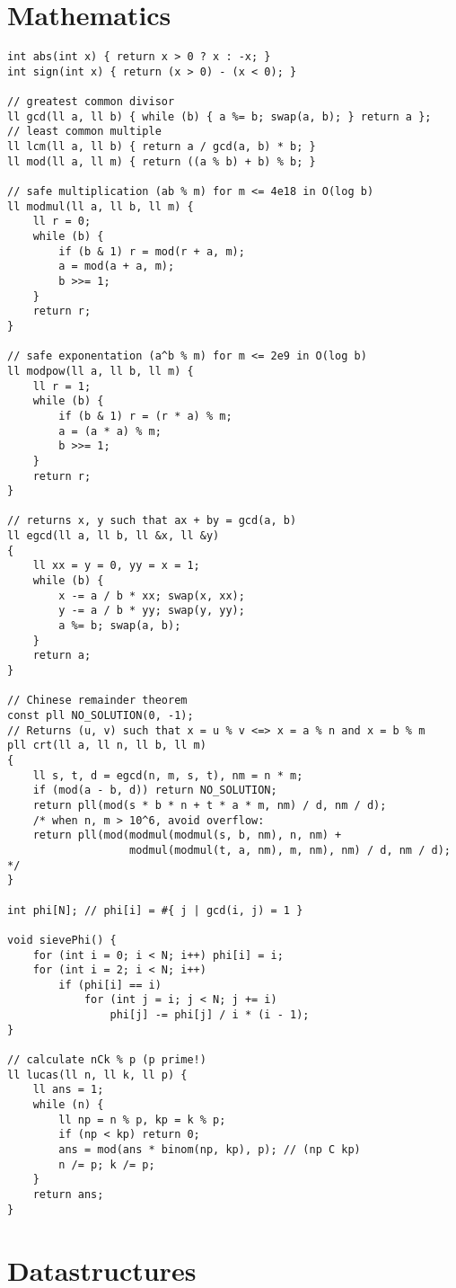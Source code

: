 \documentclass{article}
\begin{document}
\section{Mathematics}

\begin{lstlisting}
int abs(int x) { return x > 0 ? x : -x; }
int sign(int x) { return (x > 0) - (x < 0); }

// greatest common divisor
ll gcd(ll a, ll b) { while (b) { a %= b; swap(a, b); } return a };
// least common multiple
ll lcm(ll a, ll b) { return a / gcd(a, b) * b; }
ll mod(ll a, ll m) { return ((a % b) + b) % b; }

// safe multiplication (ab % m) for m <= 4e18 in O(log b)
ll modmul(ll a, ll b, ll m) {
	ll r = 0;
	while (b) {
		if (b & 1) r = mod(r + a, m);
		a = mod(a + a, m);
		b >>= 1;
	}
	return r;
}

// safe exponentation (a^b % m) for m <= 2e9 in O(log b)
ll modpow(ll a, ll b, ll m) {
	ll r = 1;
	while (b) {
		if (b & 1) r = (r * a) % m;
		a = (a * a) % m;
		b >>= 1;
	}
	return r;
}

// returns x, y such that ax + by = gcd(a, b)
ll egcd(ll a, ll b, ll &x, ll &y)
{
	ll xx = y = 0, yy = x = 1;
	while (b) {
		x -= a / b * xx; swap(x, xx);
		y -= a / b * yy; swap(y, yy);
		a %= b; swap(a, b);
	}
	return a;
}

// Chinese remainder theorem
const pll NO_SOLUTION(0, -1);
// Returns (u, v) such that x = u % v <=> x = a % n and x = b % m
pll crt(ll a, ll n, ll b, ll m)
{
	ll s, t, d = egcd(n, m, s, t), nm = n * m;
	if (mod(a - b, d)) return NO_SOLUTION;
	return pll(mod(s * b * n + t * a * m, nm) / d, nm / d);
	/* when n, m > 10^6, avoid overflow:
	return pll(mod(modmul(modmul(s, b, nm), n, nm) + 
				   modmul(modmul(t, a, nm), m, nm), nm) / d, nm / d); */
}

int phi[N]; // phi[i] = #{ j | gcd(i, j) = 1 }

void sievePhi() {
	for (int i = 0; i < N; i++) phi[i] = i;
	for (int i = 2; i < N; i++)
		if (phi[i] == i)
			for (int j = i; j < N; j += i)
				phi[j] -= phi[j] / i * (i - 1);
}

// calculate nCk % p (p prime!)
ll lucas(ll n, ll k, ll p) {
	ll ans = 1;
	while (n) {
		ll np = n % p, kp = k % p;
		if (np < kp) return 0;
		ans = mod(ans * binom(np, kp), p); // (np C kp)
		n /= p; k /= p;
	}
	return ans;
}
\end{lstlisting}

\section{Datastructures}
\end{document}
